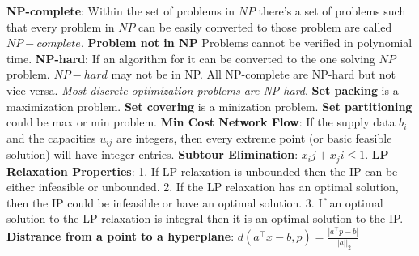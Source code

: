 \documentclass{article}
\begin{document}
\textbf{NP-complete}: Within the set of problems in $NP$ there's a set of problems such that every problem in $NP$ can be easily converted to those problem are called $NP-complete$.
\textbf{Problem not in NP} Problems cannot be verified in polynomial time.
\textbf{NP-hard}: If an algorithm for it can be converted to the one solving $NP$ problem. $NP-hard$ may not be in NP. All NP-complete are NP-hard but not vice versa. \textit{Most discrete optimization problems are NP-hard}.
\textbf{Set packing} is a maximization problem.
\textbf{Set covering} is a minization problem.
\textbf{Set partitioning} could be max or min problem.
\textbf{Min Cost Network Flow}: If the supply data $b_i$ and the capacities $u_{ij}$ are integers, then every extreme point (or basic feasible solution) will have integer entries.
\textbf{Subtour Elimination}: $x_ij + x_ji \le 1$.
\textbf{LP Relaxation Properties}: 1. If LP relaxation is unbounded then the IP can be either infeasible or unbounded. 2. If the LP relaxation has an optimal solution, then the IP could be infeasible or have an optimal solution. 3. If an optimal solution to the LP relaxation is integral then it is an optimal solution to the IP.
\textbf{Distrance from a point to a hyperplane}: $d(a^\top x -b, p)=\frac{|a^\top p -b|}{||a||_2}$
\end{document}
